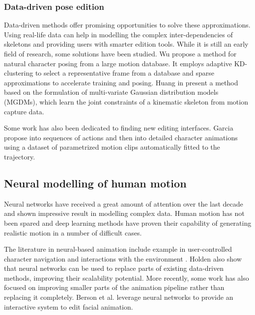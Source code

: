\subsubsection{Data-driven pose edition}
Data-driven methods offer promising opportunities to solve these approximations. Using real-life data can help in modelling the complex inter-dependencies of skeletons and providing users with smarter edition tools.
While it is still an early field of research, some solutions have been studied. Wu \etal \cite{wu_posing_2009} propose a method for natural character posing from a large motion database. It employs adaptive KD-clustering to select a representative frame from a database and sparse approximations to accelerate training and posing. 
Huang \etal in \cite{Huang_IK_MGDM_2017} present a method based on the formulation of multi-variate Gaussian distribution models (MGDMs), which learn the joint constraints of a kinematic skeleton from motion capture data. 

Some work has also been dedicated to finding new editing interfaces.  Garcia \etal \cite{garcia_sketching_2019} propose  into sequences of actions and then into detailed character animations using a dataset of parametrized motion clips automatically fitted to the trajectory. 

\subsection{Neural modelling of human motion}
Neural networks have received a great amount of attention over the last decade and shown impressive result in modelling complex data. Human motion has not been spared and deep learning methods have proven their capability of generating realistic motion in a number of difficult cases. 

The literature in neural-based animation include example in user-controlled character navigation \cite{Holden2017} and interactions with the environment \cite{starke_neural_2019}. 
Holden \etal \cite{Holden2020} also show that neural networks can be used to replace parts of existing data-driven methods, improving their scalability potential.
More recently, some work has also focused on improving smaller parts of the animation pipeline rather than replacing it completely. Berson et al. \cite{berson_intuitive_2020} leverage neural networks to provide an interactive system to edit facial animation. 

